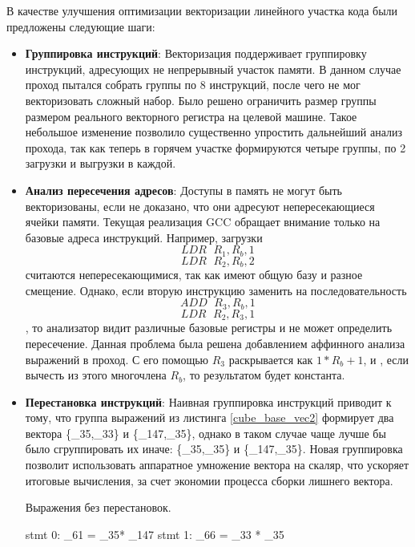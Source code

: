В качестве улучшения оптимизации  векторизации линейного участка кода были предложены следующие шаги:
\begin{itemize}
	\item \textbf{Группировка инструкций}: Векторизация поддерживает группировку инструкций, адресующих не непрерывный участок памяти. В данном случае проход пытался собрать группы по 8 инструкций, после чего не мог векторизовать сложный набор. Было решено ограничить размер группы размером реального  векторного регистра на целевой машине.  Такое небольшое изменение позволило существенно упростить дальнейший анализ прохода, так как теперь в горячем участке формируются четыре группы, по 2 загрузки и выгрузки в каждой.
	\item \textbf{Анализ пересечения адресов}: Доступы в память не могут быть векторизованы, если не доказано, что они адресуют непересекающиеся ячейки памяти. Текущая реализация GCC обращает внимание только на базовые адреса инструкций. Например, загрузки
	$$LDR\phantom{S}R_1, R_b, 1$$
	$$LDR\phantom{S}R_2, R_b, 2$$
	считаются непересекающимися, так как имеют общую базу и разное смещение. Однако, если вторую инструкцию заменить на последовательность
	$$ADD\phantom{S}R_3, R_b, 1$$
	$$LDR\phantom{S}R_2, R_3, 1$$,
	то анализатор видит различные базовые регистры и не может определить пересечение. Данная проблема была решена добавлением аффинного анализа выражений в проход. С его помощью $R_3$ раскрывается как $1*R_b + 1$, и , если вычесть из этого многочлена $R_b$, то результатом будет константа.
	\item \textbf{Перестановка инструкций}: Наивная группировка инструкций приводит к тому, что группа выражений из листинга \ref{cube_base_vec2} формирует два вектора \{\_35,\_33\} и \{\_147,\_35\}, однако в таком случае чаще лучше бы было сгруппировать их иначе: \{\_35,\_35\} и \{\_147,\_35\}. Новая группировка позволит использовать аппаратное умножение вектора на скаляр, что ускоряет итоговые вычисления, за счет экономии процесса сборки лишнего вектора.
	\begin{ListingEnv}[!h]
		\captiondelim{ } %
		\caption{Выражения без перестановок.}\label{cube_base_vec2}
		
		\begin{Verb}
				stmt 0: _61 = _35* _147
				stmt 1: _66 = _33 * _35
		\end{Verb}
	\end{ListingEnv}
\end{itemize}

